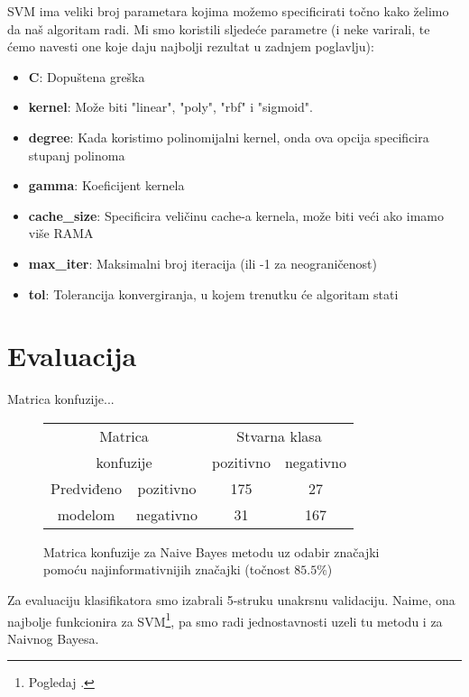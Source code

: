 \documentclass[conference]{IEEEtran}
\begin{document}
SVM ima veliki broj parametara kojima možemo specificirati točno kako želimo
da naš algoritam radi. Mi smo koristili sljedeće parametre (i
neke varirali, te ćemo navesti one koje daju najbolji rezultat u zadnjem
poglavlju):

\begin{itemize}
  \item{\textbf{C}:} Dopuštena greška
  \item{\textbf{kernel}:} Može biti "linear", "poly", "rbf" i "sigmoid".
  \item{\textbf{degree}:} Kada koristimo polinomijalni kernel, onda ova opcija
    specificira stupanj polinoma
  \item{\textbf{gamma}:} Koeficijent kernela
  \item{\textbf{cache\_size}:} Specificira veličinu cache-a kernela, može biti
    veći ako imamo više RAMA
  \item{\textbf{max\_iter}:} Maksimalni broj iteracija (ili -1 za neograničenost)
  \item{\textbf{tol}:} Tolerancija konvergiranja, u kojem trenutku će algoritam
    stati
\end{itemize}

\section{Evaluacija}

Matrica konfuzije...

\begin{figure}[!ht]
\begin{minipage}{0.5\textwidth}
\centering
\begin{tabular}{|c|c|c|c|}
  \hline
  \multicolumn{2}{|c|}{Matrica}  & \multicolumn{2}{|c|}{Stvarna klasa} \\ 
  \cline{3-4}
  \multicolumn{2}{|c|}{konfuzije} & pozitivno & negativno \\ 
  \hline
  Predviđeno & pozitivno & 175 & 27 \\
  \cline{2-4}
  modelom & negativno & 31 & 167 \\
  \hline
\end{tabular}
\caption{Matrica konfuzije za Naive Bayes metodu uz odabir značajki pomoću najinformativnijih značajki (točnost $85.5\%$)}
\end{minipage}
\end{figure}

Za evaluaciju klasifikatora smo izabrali 5-struku unakrsnu validaciju. Naime,
ona najbolje funkcionira za SVM\footnote{Pogledaj \cite{scikit}.}, pa smo
radi jednostavnosti uzeli tu metodu i za Naivnog Bayesa.
\end{document}
